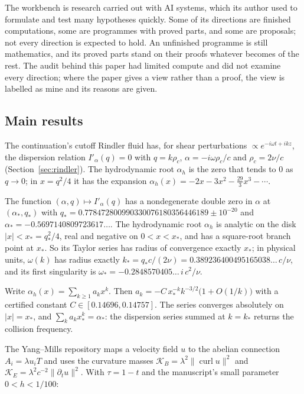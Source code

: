The workbench is research carried out with AI systems, which its author used to formulate and test many hypotheses quickly. Some of its directions are finished computations, some are programmes with proved parts, and some are proposals; not every direction is expected to hold. An unfinished programme is still mathematics, and its proved parts stand on their proofs whatever becomes of the rest. The audit behind this paper had limited compute and did not examine every direction; where the paper gives a view rather than a proof, the view is labelled as mine and its reasons are given.

\subsection*{Main results}

The continuation's cutoff Rindler fluid has, for shear perturbations $\propto e^{-i\omega t+ikz}$, the dispersion relation $I'_\alpha(q)=0$ with $q=k\rho_c$, $\alpha=-i\omega\rho_c/c$ and $\rho_c=2\nu/c$ (Section~\ref{sec:rindler}). The hydrodynamic root $\alpha_h$ is the zero that tends to $0$ as $q\to0$; in $x=q^2/4$ it has the expansion $\alpha_h(x)=-2x-3x^2-\tfrac{29}3x^3-\cdots$.

\begin{introthm}
The function $(\alpha,q)\mapsto I'_\alpha(q)$ has a nondegenerate double zero in $\alpha$ at $(\alpha_*,q_*)$ with $q_*=0.778472800990330076180356446189\pm10^{-20}$ and $\alpha_*=-0.5697140809723617\ldots$. The hydrodynamic root $\alpha_h$ is analytic on the disk $|x|<x_*=q_*^2/4$, real and negative on $0<x<x_*$, and has a square-root branch point at $x_*$. So its Taylor series has radius of convergence exactly $x_*$; in physical units, $\omega(k)$ has radius exactly $k_*=q_*c/(2\nu)=0.389236400495165038\ldots\,c/\nu$, and its first singularity is $\omega_*=-0.2848570405\ldots\,i\,c^2/\nu$.
\end{introthm}

\begin{introthm}
Write $\alpha_h(x)=\sum_{k\ge1}a_kx^k$. Then $a_k=-C\,x_*^{-k}k^{-3/2}\bigl(1+O(1/k)\bigr)$ with a certified constant $C\in[0.14696,0.14757]$. The series converges absolutely on $|x|=x_*$, and $\sum_ka_kx_*^k=\alpha_*$: the dispersion series summed at $k=k_*$ returns the collision frequency.
\end{introthm}

The Yang--Mills repository maps a velocity field $u$ to the abelian connection $A_i=\lambda u_iT$ and uses the curvature masses $\mathcal K_B=\lambda^2\|\operatorname{curl}u\|^2$ and $\mathcal K_E=\lambda^2c^{-2}\|\partial_tu\|^2$. With $\tau=1-t$ and the manuscript's small parameter $0<h<1/100$:

